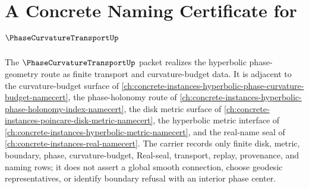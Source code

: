 \chapter{A Concrete Naming Certificate for $\PhaseCurvatureTransportUp$}
\label{ch:concrete-instances-phase-curvature-transport-namecert}

The $\PhaseCurvatureTransportUp$ packet realizes the hyperbolic phase-geometry route as finite transport and curvature-budget data. It is adjacent to the curvature-budget surface of \autoref{ch:concrete-instances-hyperbolic-phase-curvature-budget-namecert}, the phase-holonomy route of \autoref{ch:concrete-instances-hyperbolic-phase-holonomy-index-namecert}, the disk metric surface of \autoref{ch:concrete-instances-poincare-disk-metric-namecert}, the hyperbolic metric interface of \autoref{ch:concrete-instances-hyperbolic-metric-namecert}, and the real-name seal of \autoref{ch:concrete-instances-real-namecert}. The carrier records only finite disk, metric, boundary, phase, curvature-budget, Real-seal, transport, replay, provenance, and naming rows; it does not assert a global smooth connection, choose geodesic representatives, or identify boundary refusal with an interior phase center.

